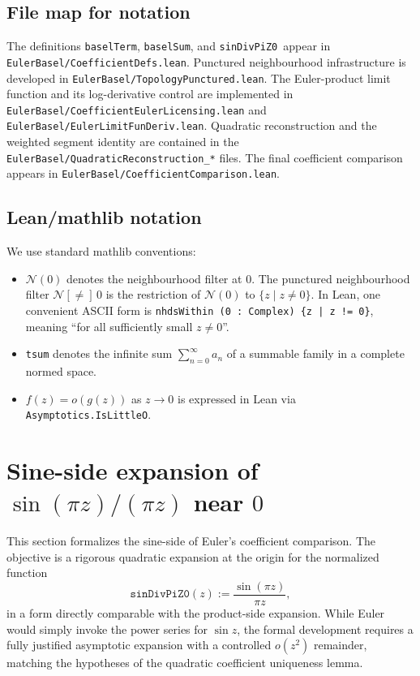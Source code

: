 \documentclass[11pt,a4paper]{article}
\theoremstyle{plain}
\theoremstyle{definition}
\DeclareRobustCommand{\codepath}[1]{\nolinkurl{#1}}
\newcommand{\msec}[2]{\texorpdfstring{#1}{#2}}
\DeclareRobustCommand{\leanid}[1]{\texttt{#1}}
\DeclareRobustCommand{\codepath}[1]{\nolinkurl{#1}}
\newcommand{\sinDivPiZZero}{\leanid{sinDivPiZ0}}
\begin{document}
\subsection{File map for notation}

The definitions \texttt{baselTerm}, \texttt{baselSum}, and \sinDivPiZZero\ appear in
\codepath{EulerBasel/CoefficientDefs.lean}. Punctured neighbourhood infrastructure is developed in \codepath{EulerBasel/TopologyPunctured.lean}. The Euler-product limit function and its log-derivative control are implemented in \codepath{EulerBasel/CoefficientEulerLicensing.lean} and \codepath{EulerBasel/EulerLimitFunDeriv.lean}. Quadratic reconstruction and the weighted segment identity are contained in the \codepath{EulerBasel/QuadraticReconstruction_*} files. The final coefficient comparison appears in \codepath{EulerBasel/CoefficientComparison.lean}.

\subsection{Lean/mathlib notation}

We use standard mathlib conventions:

\begin{itemize}[leftmargin=2em]
\item $\mathcal{N}(0)$ denotes the neighbourhood filter at $0$. The punctured neighbourhood filter
$\mathcal{N}[{\neq}]\,0$ is the restriction of $\mathcal{N}(0)$ to $\{ z \mid z \neq 0 \}$.
In Lean, one convenient ASCII form is
\texttt{nhdsWithin (0 : Complex) \{z | z != 0\}},
meaning “for all sufficiently small $z \neq 0$”.

\item \texttt{tsum} denotes the infinite sum $\sum_{n=0}^{\infty} a_n$ of a summable
family in a complete normed space.

\item $f(z) = o(g(z))$ as $z \to 0$ is expressed in Lean via
\texttt{Asymptotics.IsLittleO}.
\end{itemize}

\section{\msec{Sine-side expansion of \ensuremath{\sin(\pi z)/(\pi z)} near \ensuremath{0}}{Sine-side expansion of sin(pi z)/(pi z) near 0}}

This section formalizes the sine-side of Euler’s coefficient comparison. The objective is a rigorous quadratic expansion at the origin for the normalized function
\[
\sinDivPiZZero(z) := \frac{\sin(\pi z)}{\pi z},
\]
in a form directly comparable with the product-side expansion. While Euler would simply invoke the power series for $\sin z$, the formal development requires a fully justified asymptotic expansion with a controlled $o(z^{2})$ remainder, matching the hypotheses of the quadratic coefficient uniqueness lemma.
\end{document}
